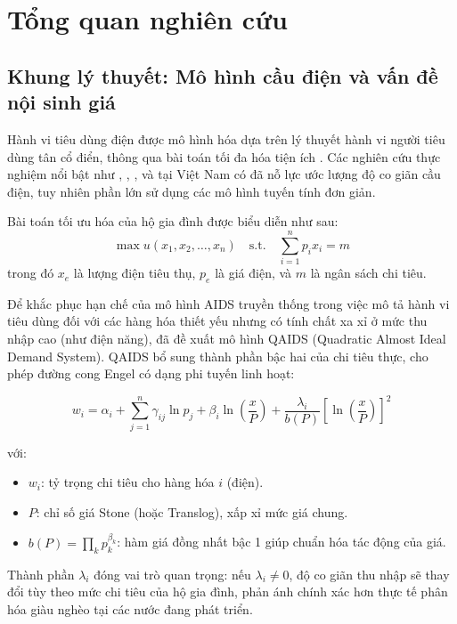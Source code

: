 \documentclass[12pt,a4paper,oneside]{article}
\begin{document}
	\section{Tổng quan nghiên cứu}
	
	\subsection{Khung lý thuyết: Mô hình cầu điện và vấn đề nội sinh giá}
	
	Hành vi tiêu dùng điện được mô hình hóa dựa trên lý thuyết hành vi người tiêu dùng tân cổ điển, thông qua bài toán tối đa hóa tiện ích \parencite{varian1992}. Các nghiên cứu thực nghiệm nổi bật như \parencite{ito2014}, \parencite{filippini2016}, \parencite{balarama2020}, và tại Việt Nam có \parencite{le2020} đã nỗ lực ước lượng độ co giãn cầu điện, tuy nhiên phần lớn sử dụng các mô hình tuyến tính đơn giản.
	
	Bài toán tối ưu hóa của hộ gia đình được biểu diễn như sau:
	\begin{equation}
		\max u(x_1, x_2, \ldots, x_n) \quad \text{s.t.} \quad \sum_{i=1}^n p_i x_i = m
	\end{equation}
	trong đó $x_e$ là lượng điện tiêu thụ, $p_e$ là giá điện, và $m$ là ngân sách chi tiêu.
	
	Để khắc phục hạn chế của mô hình AIDS truyền thống trong việc mô tả hành vi tiêu dùng đối với các hàng hóa thiết yếu nhưng có tính chất xa xỉ ở mức thu nhập cao (như điện năng), \textcite{banks1997} đã đề xuất mô hình QAIDS (Quadratic Almost Ideal Demand System). QAIDS bổ sung thành phần bậc hai của chi tiêu thực, cho phép đường cong Engel có dạng phi tuyến linh hoạt:
	
	\begin{equation}
		w_i = \alpha_i + \sum_{j=1}^n \gamma_{ij} \ln p_j + \beta_i \ln \left(\frac{x}{P}\right) + \frac{\lambda_i}{b(P)} \left[\ln\left(\frac{x}{P}\right)\right]^2
	\end{equation}
	
	với:
	\begin{itemize}
		\item $w_i$: tỷ trọng chi tiêu cho hàng hóa $i$ (điện).
		\item $P$: chỉ số giá Stone (hoặc Translog), xấp xỉ mức giá chung.
		\item $b(P) = \prod_k p_k^{\beta_k}$: hàm giá đồng nhất bậc 1 giúp chuẩn hóa tác động của giá.
	\end{itemize}
	
	Thành phần $\lambda_i$ đóng vai trò quan trọng: nếu $\lambda_i \neq 0$, độ co giãn thu nhập sẽ thay đổi tùy theo mức chi tiêu của hộ gia đình, phản ánh chính xác hơn thực tế phân hóa giàu nghèo tại các nước đang phát triển.
	
\end{document}
